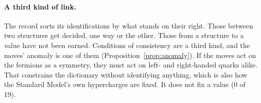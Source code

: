 
\paragraph{A third kind of link.}
The record sorts its identifications by what stands on their right. Those between two structures get decided, one way
or the other. Those from a structure to a value have not been earned. Conditions of consistency are a third kind, and
the moves' anomaly is one of them (Proposition~\ref{prop:anomaly}). If the moves act on the fermions as a symmetry,
they must act on left- and right-handed quarks alike. That constrains the dictionary without identifying anything,
which is also how the Standard Model's own hypercharges are fixed. It does not fix a value (0 of 19).

